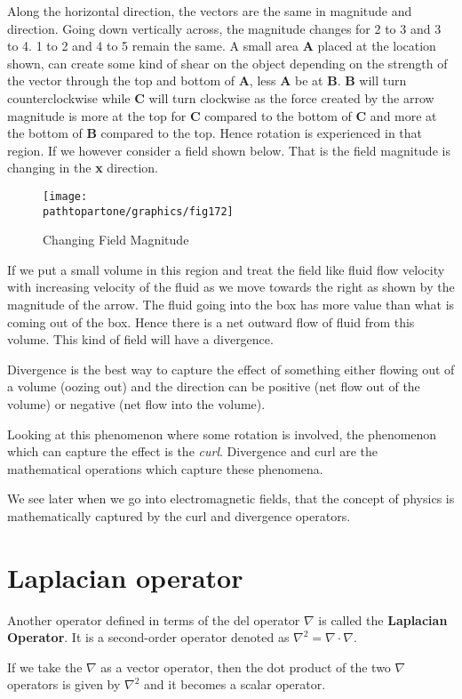Along the horizontal direction, the vectors are the same in magnitude and direction. Going down vertically across, the magnitude changes for 2 to 3 and 3 to 4. 1 to 2 and 4 to 5 remain the same. A small area \textbf{A} placed at the location shown, can create some kind of shear on the object depending on the strength of the vector through the top and bottom of \textbf{A}, less \textbf{A} be at \textbf{B}. \textbf{B} will turn counterclockwise while \textbf{C} will turn clockwise as the force created by the arrow magnitude is more at the top for \textbf{C} compared to the bottom of \textbf{C} and more at the bottom of \textbf{B} compared to the top. Hence rotation is experienced in that region. If we however consider a field shown below. That is the field magnitude is changing in the \textbf{x} direction.
\begin{figure}[h]
\centering
\texttt{[image: \\pathtopartone/graphics/fig172]}
\caption{Changing Field Magnitude}
\end{figure}

If we put a small volume in this region and treat the field like fluid flow velocity with increasing velocity of the fluid as we move towards the right as shown by the magnitude of the arrow. The fluid going into the box has more value than what is coming out of the box. Hence there is a net outward flow of fluid from this volume. This kind of field will have a divergence.

Divergence is the best way to capture the effect of something either flowing out of a volume (oozing out) and the direction can be positive (net flow out of the volume) or negative (net flow into the volume).

Looking at this phenomenon where some rotation is involved, the phenomenon which can capture the effect is the \textit{curl}. Divergence and curl are the mathematical operations which capture these phenomena.

We see later when we go into electromagnetic fields, that the concept of physics is mathematically captured by the curl and divergence operators.

\section{Laplacian operator}
Another operator defined in terms of the del operator $\nabla$ is called the \textbf{Laplacian Operator}. It is a second-order operator denoted as $\nabla^2 = \nabla \cdot \nabla$.

If we take the $\nabla$ as a vector operator, then the dot product of the two $\nabla$ operators is given by $\nabla^2$ and it becomes a scalar operator.

